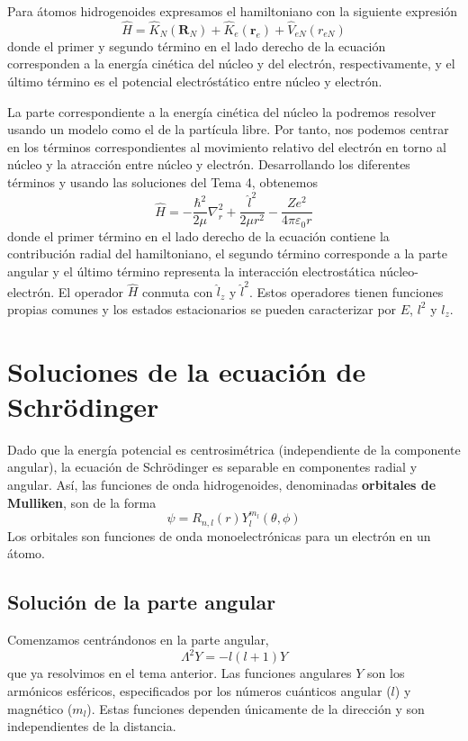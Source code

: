 Para átomos hidrogenoides expresamos el hamiltoniano con la siguiente
expresión
\begin{equation}
    \hat{H}=\hat{K}_N(\mathbf{R}_N) + \hat{K}_e(\mathbf{r}_e) + \hat{V}_{eN}(r_{eN})
\end{equation}
donde el primer y segundo término en el lado derecho de la ecuación 
corresponden a la energía cinética del núcleo y del electrón, 
respectivamente, y el último término es el potencial electróstático 
entre núcleo y electrón. 

La parte correspondiente a la energía cinética del núcleo la
podremos resolver usando un modelo como el de la partícula
libre. Por tanto, nos podemos centrar en los términos 
correspondientes al movimiento relativo del electrón en torno
al núcleo y la atracción entre núcleo y electrón. Desarrollando 
los diferentes términos y usando las soluciones del Tema 4,
obtenemos
\begin{equation}
    \hat{H}=-\frac{\hbar^2}{2\mu}\nabla_r^2+ \frac{\hat{l}^2}{2\mu r^2} - \frac{Ze^2}{4\pi \varepsilon_0r}
\end{equation}
donde el primer término en el lado derecho de la ecuación
contiene la contribución radial del hamiltoniano, el segundo 
término corresponde a la parte angular y el último término
representa la interacción electrostática núcleo-electrón.
El operador $\hat{H}$ conmuta con $\hat{l}_z$ y $\hat{l}^2$. Estos
operadores tienen funciones propias comunes y los estados estacionarios
se pueden caracterizar por $E$, $l^2$ y $l_z$. 

\section{Soluciones de la ecuación de Schrödinger}
Dado que la energía potencial es centrosimétrica (independiente
de la componente angular), la ecuación de Schrödinger es separable
en componentes radial y angular. Así, las funciones de onda
hidrogenoides, denominadas \textbf{orbitales de Mulliken}, son de la forma
\begin{equation}
    \psi=R_{n,l}(r)Y^{m_l}_l(\theta,\phi)
\end{equation}
Los orbitales son funciones de onda monoelectrónicas para un
electrón en un átomo.

\subsection{Solución de la parte angular}
Comenzamos centrándonos en la parte angular, 
\begin{equation}
    \Lambda^2Y=-l(l+1)Y
\end{equation}
que ya resolvimos en el tema anterior. Las funciones angulares $Y$ 
son los armónicos esféricos, especificados por los números cuánticos
angular ($l$) y magnético ($m_l$). Estas funciones dependen únicamente
de la dirección y son independientes de la distancia. 


